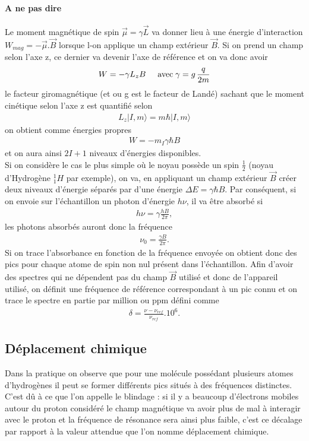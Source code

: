\documentclass[12pt,prb,aps,epsf]{report}
\begin{document}
\paragraph{A ne pas dire} Le moment magnétique de spin $\vec{\mu} = \gamma \vec{L}$ va donner lieu à une énergie d'interaction $W_{mag} = -\vec{\mu}.\vec{B}$ lorsque l-on applique un champ extérieur $\vec{B}$. Si on prend un champ selon l'axe z, ce dernier va devenir l'axe de référence et on va donc avoir
\begin{eqnarray}
W = -\gamma L_z B \hspace{0.5cm} \mathrm{avec}\; \gamma = g\,\frac{q}{2m}
\end{eqnarray}
le facteur giromagnétique (et ou g est le facteur de Landé) sachant que le moment cinétique selon l'axe z est quantifié selon
\begin{eqnarray}
L_z | I,m\rangle = m\hbar |I ,m\rangle
\end{eqnarray}
on obtient comme énergies propres 
\begin{eqnarray}
W = -m_I\gamma \hbar B
\end{eqnarray}
et on aura ainsi $2I+1$ niveaux d'énergies disponibles.\\

Si on considère le cas le plus simple où le noyau possède un spin $\frac{1}{2}$ (noyau d'Hydrogène $^1_1H$ par exemple), on va, en appliquant un champ extérieur $\vec{B}$ créer deux niveaux d'énergie séparés par d'une énergie $\Delta E = \gamma \hbar B$. Par conséquent, si on envoie sur l'échantillon un photon d'énergie $h\nu$, il va être absorbé si 
\begin{eqnarray}
h\nu = \gamma \frac {h B}{2\pi},
\end{eqnarray}
les photons absorbés auront donc la fréquence 
\begin{eqnarray}
	\nu_0 = \frac{\gamma B}{2\pi}.
\end{eqnarray}
Si on trace l'absorbance en fonction de la fréquence envoyée on obtient donc des pics pour chaque atome de spin non nul présent dans l'échantillon. Afin d'avoir des spectres qui ne dépendent pas du champ $\vec{B}$ utilisé et donc de l'appareil utilisé, on définit une fréquence de référence correspondant à un pic connu et on trace le spectre en partie par million ou ppm défini comme 
\begin{eqnarray}
\delta = \frac{\nu-\nu_{ref}}{\nu_{ref}}.10^6.
\end{eqnarray}
\subsection{Déplacement chimique}
Dans la pratique on observe que pour une molécule possédant plusieurs atomes d'hydrogènes il peut se former différents pics situés à des fréquences distinctes. C'est dû à ce que l'on appelle le blindage : si il y a beaucoup d'électrons mobiles autour du proton considéré le champ magnétique va avoir plus de mal à interagir avec le proton et la fréquence de résonance sera ainsi plus faible, c'est ce décalage par rapport à la valeur attendue que l'on nomme déplacement chimique.\\
\end{document}
